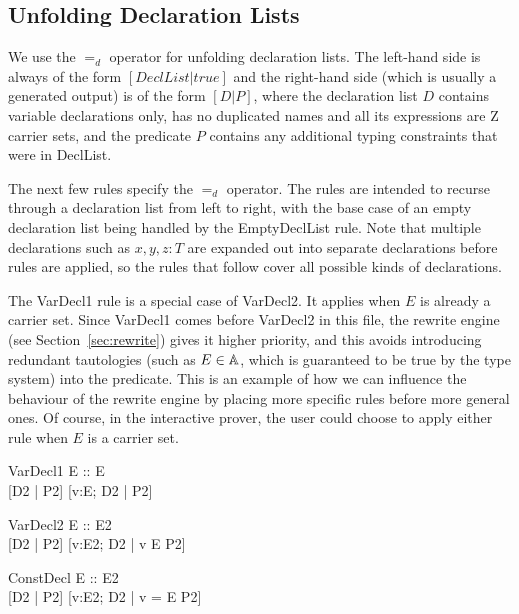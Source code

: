 \documentclass{entcs}
\newcommand{\declListUnfoldsTo}{\mathrel{=_d}}
\begin{document}
\subsection{Unfolding Declaration Lists}

We use the $\declListUnfoldsTo$ operator for unfolding declaration
lists.  The left-hand side is always of the form $[DeclList|true]$ and
the right-hand side (which is usually a generated output) is of the
form $[D|P]$, where the declaration list $D$ contains variable
declarations only, has no duplicated names and all its expressions are
Z carrier sets, and the predicate $P$ contains any additional typing
constraints that were in DeclList.

The next few rules specify the $\declListUnfoldsTo$ operator.
The rules are intended to recurse through a declaration list from left
to right, with the base case of an empty declaration list being handled
by the EmptyDeclList rule.  Note that multiple declarations such as
$x,y,z:T$ are expanded out into separate declarations before rules
are applied, so the rules that follow cover all possible kinds
of declarations.

The VarDecl1 rule is a special case of VarDecl2.  It applies when $E$ is
already a carrier set.  Since VarDecl1 comes before VarDecl2 in this file,
the rewrite engine (see Section~\ref{sec:rewrite}) gives it higher
priority, and this avoids introducing redundant tautologies (such as $E \in
{\mathbb A}$, which is guaranteed to be true by the type system) into the
predicate.  This is an example of how we can influence the behaviour of the
rewrite engine by placing more specific rules before more general ones.  Of
course, in the interactive prover, the user could choose to apply either
rule when $E$ is a carrier set.

\begin{zedrule}{VarDecl1}
   \proviso E :: \power E \\
   [D1 | true] \declListUnfoldsTo [D2 | P2]
\derives
   [v:E; D1 | true] \declListUnfoldsTo [v:E; D2 |  P2]
\end{zedrule}

\begin{zedrule}{VarDecl2}
   \proviso E :: \power E2 \\
   [D1 | true] \declListUnfoldsTo [D2 | P2]
\derives
   [v:E; D1 | true] \declListUnfoldsTo [v:E2; D2 |  v \in E \land P2]
\end{zedrule}

\begin{zedrule}{ConstDecl}
   \proviso E :: E2 \\
   [D1 | true] \declListUnfoldsTo [D2 | P2]
\derives
   [v==E; D1 | true] \declListUnfoldsTo [v:E2; D2 |  v = E \land P2]
\end{zedrule}
\end{document}
